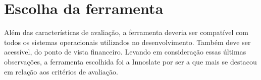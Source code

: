 \section{Escolha da ferramenta}

Além das características de avaliação, a ferramenta deveria ser compatível com todos os sistemas operacionais utilizados no desenvolvimento. Também deve ser acessível, do ponto de vista financeiro. Levando em consideração essas últimas observações, a ferramenta escolhida foi a Innoslate por ser a que mais se destacou em relação aos critérios de avaliação.

